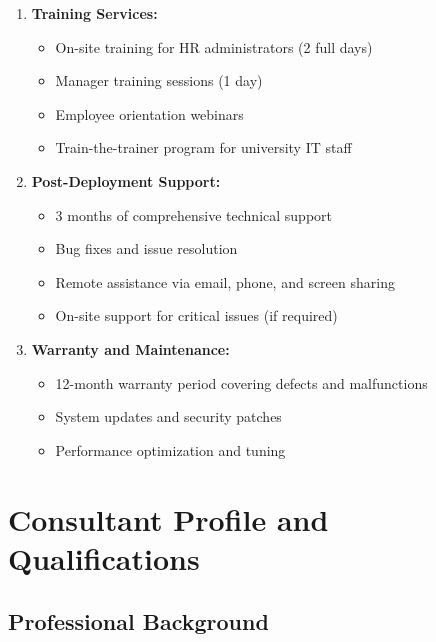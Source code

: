 \documentclass[12pt]{article}
\begin{document}
\begin{enumerate}
\item \textbf{Training Services:}
   \begin{itemize}[noitemsep]
   \item On-site training for HR administrators (2 full days)
   \item Manager training sessions (1 day)
   \item Employee orientation webinars
   \item Train-the-trainer program for university IT staff
   \end{itemize}

\item \textbf{Post-Deployment Support:}
   \begin{itemize}[noitemsep]
   \item 3 months of comprehensive technical support
   \item Bug fixes and issue resolution
   \item Remote assistance via email, phone, and screen sharing
   \item On-site support for critical issues (if required)
   \end{itemize}

\item \textbf{Warranty and Maintenance:}
   \begin{itemize}[noitemsep]
   \item 12-month warranty period covering defects and malfunctions
   \item System updates and security patches
   \item Performance optimization and tuning
   \end{itemize}
\end{enumerate}

\section{Consultant Profile and Qualifications}

\subsection{Professional Background}
\end{document}
